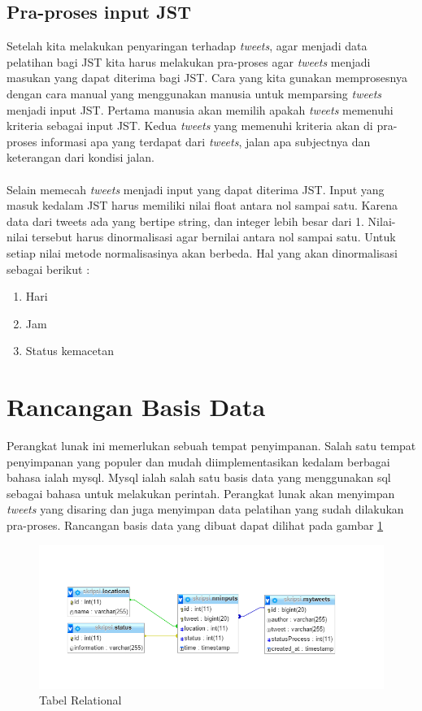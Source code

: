 \subsection{Pra-proses input JST}
Setelah kita melakukan penyaringan terhadap \textit{tweets}, agar menjadi data pelatihan bagi JST kita harus melakukan pra-proses agar \textit{tweets} menjadi masukan yang dapat diterima bagi JST. Cara yang kita gunakan memprosesnya dengan cara manual yang menggunakan manusia untuk memparsing \textit{tweets} menjadi input JST. Pertama manusia akan memilih apakah \textit{tweets} memenuhi kriteria sebagai input JST. Kedua \textit{tweets} yang memenuhi kriteria akan di pra-proses informasi apa yang terdapat dari \textit{tweets}, jalan apa subjectnya dan keterangan dari kondisi jalan.\\\\
Selain memecah \textit{tweets} menjadi input yang dapat diterima JST. Input yang masuk kedalam JST harus memiliki nilai float antara nol sampai satu. Karena data dari tweets ada yang bertipe string, dan integer lebih besar dari 1. Nilai-nilai tersebut harus dinormalisasi agar bernilai antara nol sampai satu. Untuk setiap nilai metode normalisasinya akan berbeda. Hal yang akan dinormalisasi sebagai berikut :
\begin{enumerate}
	\item Hari
	\item Jam
	\item Status kemacetan
\end{enumerate}
\section{Rancangan Basis Data}
Perangkat lunak ini memerlukan sebuah tempat penyimpanan. Salah satu tempat penyimpanan yang populer dan mudah diimplementasikan kedalam berbagai bahasa ialah mysql. Mysql ialah salah satu basis data yang menggunakan sql sebagai bahasa untuk melakukan perintah. Perangkat lunak akan menyimpan \textit{tweets} yang disaring  dan juga menyimpan data pelatihan yang sudah dilakukan pra-proses. Rancangan basis data yang dibuat dapat dilihat pada gambar \ref{fig:r_table}
\begin{figure}
	\centering
	\includegraphics[width=1\linewidth]{Gambar/mine/relationalPL}
	\caption[Tabel Relational,]{Tabel Relational} 
	\label{fig:r_table}
\end{figure}